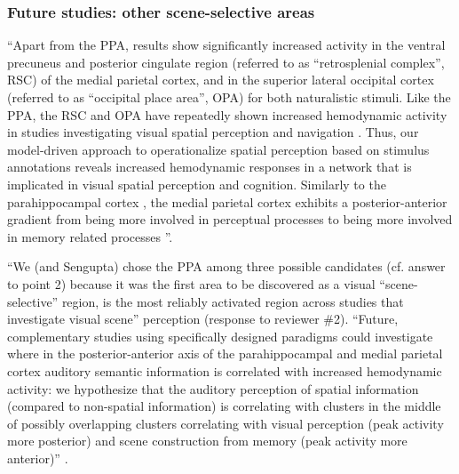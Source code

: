 \subsubsection{Future studies: other scene-selective areas}





``Apart from the PPA, results show significantly increased activity in the
ventral precuneus and posterior cingulate region (referred to as ``retrosplenial
complex'', RSC) of the medial parietal cortex, and in the superior lateral
occipital cortex (referred to as ``occipital place area'', OPA) for both
naturalistic stimuli.
Like the PPA, the RSC and OPA have repeatedly shown increased hemodynamic
activity in studies investigating visual spatial perception and navigation
\citep{chrastil2018heterogeneity, bettencourt2013role, dilks2013occipital,
epstein2019scene}.
Thus, our model-driven approach to operationalize spatial perception based on
stimulus annotations reveals increased hemodynamic responses in a network that
is implicated in visual spatial perception and cognition.
Similarly to the parahippocampal cortex \citep{aminoff2013role}, the medial
parietal cortex exhibits a posterior-anterior gradient from being more involved
in perceptual processes to being more involved in memory related processes
\citep{chrastil2018heterogeneity, hassabis2009construction, silson2019posterior,
steel2021network}''.

``We (and Sengupta) chose the PPA among three possible candidates (cf. answer to
point 2) because it was the first area to be discovered as a visual
``scene-selective'' region, is the most reliably activated region across studies
that investigate visual scene'' perception (response to reviewer \#2).
``Future, complementary studies using specifically designed paradigms could
investigate where in the posterior-anterior axis of the parahippocampal and
medial parietal cortex auditory semantic information is correlated with
increased hemodynamic activity:
we hypothesize that the auditory perception of spatial information (compared to
non-spatial information) is correlating with clusters in the middle of possibly
overlapping clusters correlating with visual perception (peak activity more
posterior) and scene construction from memory (peak activity more anterior)''
\citep{haeusler2022processing}.


